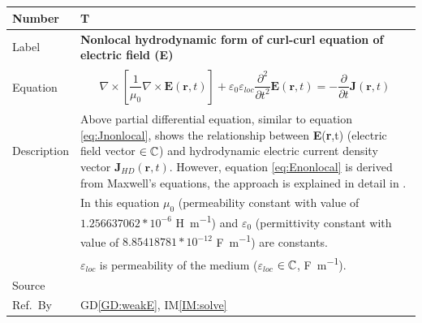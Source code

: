 \documentclass[12pt]{article}
\newcommand{\colBwidth}{0.82\textwidth} \newcommand{\colCwidth}{0.1\textwidth}
\begin{document}
	~\newline
	
	~\newline
	
	\noindent \begin{minipage}{\textwidth} \renewcommand*{\arraystretch}{1.5}
		\begin{tabular}{| p{\colAwidth} | p{\colBwidth}|} \hline \rowcolor[gray]{0.9}
			Number& T{theorynum}\thetheorynum \label{TM:E}\\ \hline Label&\bf
			Nonlocal hydrodynamic form of curl-curl equation of electric field (\textbf{E})
			\\ \hline Equation& \begin{equation} \label{eq:Enonlocal} \begin{gathered}
					\nabla\times[\dfrac{1}{\mu_{0}}\nabla\times \textbf{E}(\textbf{r},t)] +
					\varepsilon_{0}\varepsilon_{loc}\dfrac{\partial^{2}}{\partial
						t^{2}}\textbf{E}(\textbf{r},t) = -\dfrac{\partial}{\partial
						t}\textbf{J}(\textbf{r},t) \end{gathered}  \end{equation} \\
			
			
			\hline Description & Above partial differential equation, similar to equation
			\ref{eq:Jnonlocal}, shows the relationship between \textbf{E}(\textbf{r},t)
			(electric field vector $\in \Bbb C$) and hydrodynamic electric current density
			vector $\textbf{J}_{HD}(\textbf{r},t)$. However, equation \ref{eq:Enonlocal}
			is derived from  Maxwell's equations, the approach is explained in detail in
			\cite{hiremath2012numerical}. \\ & In this equation $\mu_{0}$ (permeability
			constant with value of $1.256637062 * 10^{-6}$ \si{\henry \per \meter}) and
			$\varepsilon_{0}$ (permittivity constant with value of $8.85418781*10^{-12}$
			\si{\farad \per \meter}) are constants. \\ &$\varepsilon_{loc}$ is
			permeability of the medium ($\varepsilon_{loc}$ $\in \Bbb C$, \si{\farad \per
				\meter}). \\ \hline Source & \cite{hiremath2012numerical} \\ %
			\hline Ref.\ By & GD\ref{GD:weakE}, IM\ref{IM:solve}\\ \hline \end{tabular}
	\end{minipage}\\
	
\end{document}
